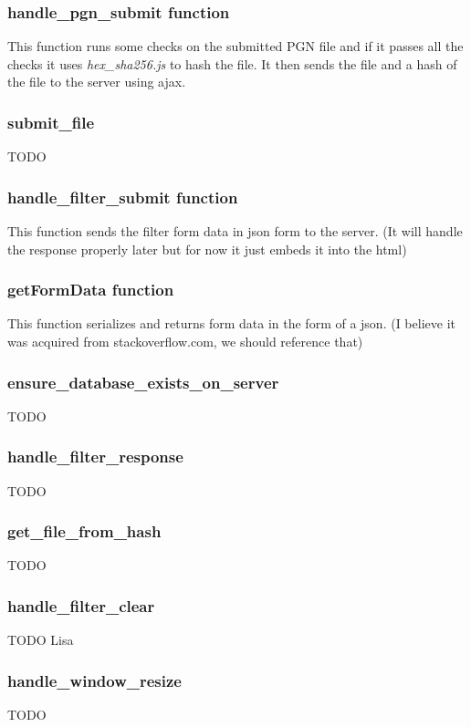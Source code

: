 \documentclass{article}
\begin{document}
\subsubsection*{handle\_pgn\_submit function}
This function runs some checks on the submitted PGN file and if it passes all the checks it uses \textit{hex\_sha256.js} to hash the file. It then sends the file and a hash of the file to the server using ajax.


\subsubsection*{submit\_file}
TODO


\subsubsection*{handle\_filter\_submit function}
This function sends the filter form data in json form to the server. (It will handle the response properly later but for now it just embeds it into the html)


\subsubsection*{getFormData function}
This function serializes and returns form data in the form of a json. (I believe it was acquired from stackoverflow.com, we should reference that)


\subsubsection*{ensure\_database\_exists\_on\_server}
TODO


\subsubsection*{handle\_filter\_response}
TODO


\subsubsection*{get\_file\_from\_hash}
TODO


\subsubsection*{handle\_filter\_clear}
TODO Lisa


\subsubsection*{handle\_window\_resize}
TODO
\end{document}
